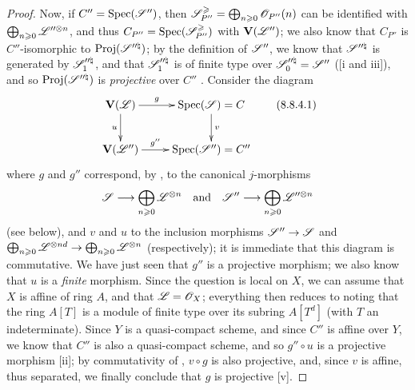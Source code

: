\begin{proof}
Now, if $C''=\operatorname{Spec}(\mathscr{S}'')$, then $\mathscr{S}_{P''}^\geqslant=\bigoplus_{n\geqslant 0}\mathscr{O}_{P''}(n)$ can be identified with $\bigoplus_{n\geqslant 0}\mathscr{L}^{\prime\prime\otimes n}$, and thus $C_{P''}=\operatorname{Spec}(\mathscr{S}_{P''}^\geqslant)$ with $\mathbf{V}(\mathscr{L}'')$;
we also know  that $C_{P''}$ is $C''$-isomorphic to $\operatorname{Proj}(\mathscr{S}^{\prime\prime\natural})$;
by the definition of $\mathscr{S}''$, we know that $\mathscr{S}^{\prime\prime\natural}$ is generated by $\mathscr{S}_1^{\prime\prime\natural}$, and that $\mathscr{S}_1^{\prime\prime\natural}$ is of finite type over $\mathscr{S}_0^{\prime\prime\natural}=\mathscr{S}''$ ([i and iii]), and so $\operatorname{Proj}(\mathscr{S}^{\prime\prime\natural})$ is \emph{projective} over $C''$ .
Consider the diagram
\[
\label{II.8.8.4.1}
  \xymatrix{
    \bb{V}(\sh{L})
      \ar[r]^-{g}
      \ar[d]_{u}
  & \Spec(\sh{S}) = C
      \ar[d]^{v}
  \\\bb{V}(\sh{L}'')
      \ar[r]^-{g''}
  & \Spec(\sh{S}'') = C''
  }
  \tag{8.8.4.1}
\]
where $g$ and $g''$ correspond, by , to the canonical $j$-morphisms
\[
  \sh{S}\to\bigoplus_{n\geq0}\sh{L}^{\otimes n}
  \quad\mbox{and}\quad
  \sh{S}''\to\bigoplus_{n\geq0}\sh{L}^{\prime\prime\otimes n}
\]
 (see  below), and $v$ and $u$ to the inclusion morphisms $\sh{S}''\to\sh{S}$ and $\bigoplus_{n\geq0}\sh{L}^{\otimes nd}\to\bigoplus_{n\geq0}\sh{L}^{\otimes n}$ (respectively);
it is immediate  that this diagram is commutative.
We have just seen that $g''$ is a projective morphism;
we also know that $u$ is a \emph{finite} morphism.
Since the question is local on $X$, we can assume that $X$ is affine of ring $A$, and that $\mathscr{L}=\mathscr{O}_X$;
everything then reduces to noting that the ring $A[T]$ is a module of finite type over its subring $A[T^d]$ (with $T$ an indeterminate).
Since $Y$ is a quasi-compact scheme, and since $C''$ is affine over $Y$, we know that $C''$ is also a quasi-compact scheme,
and so $g''\circ u$ is a projective morphism [ii];
by commutativity of , $v\circ g$ is also projective, and, since $v$ is affine, thus separated, we finally conclude that $g$ is projective [v].
\end{proof}

